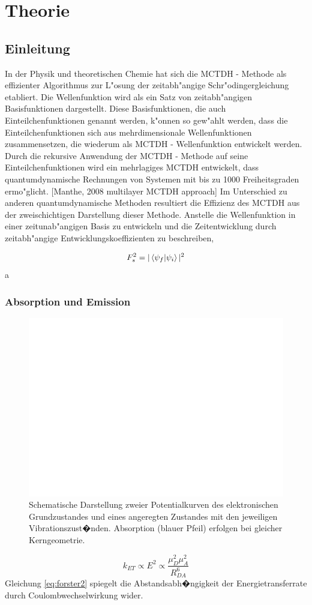 \chapter{Theorie}

\section{Einleitung}

In der Physik und theoretischen Chemie hat sich die MCTDH - Methode als effizienter Algorithmus zur L"osung der zeitabh"angige Schr"odingergleichung etabliert.
Die Wellenfunktion wird als ein Satz von zeitabh"angigen Basisfunktionen dargestellt.
Diese Basisfunktionen, die auch Einteilchenfunktionen genannt werden, k"onnen so gew"ahlt werden, dass die Einteilchenfunktionen sich aus mehrdimensionale Wellenfunktionen zusammensetzen, die wiederum als MCTDH - Wellenfunktion entwickelt werden.
Durch die rekursive Anwendung der MCTDH - Methode auf seine Einteilchenfunktionen wird ein mehrlagiges MCTDH entwickelt, dass quantumdynamische Rechnungen von Systemen mit bis zu 1000 Freiheitsgraden ermo"glicht. [Manthe, 2008 multilayer MCTDH approach]
Im Unterschied zu anderen quantumdynamische Methoden resultiert die Effizienz des MCTDH aus der zweischichtigen Darstellung dieser Methode.
Anstelle die Wellenfunktion in einer zeitunab"angigen Basis zu entwickeln und die Zeitentwicklung durch zeitabh"angige Entwicklungskoeffizienten zu beschreiben, 



 \begin{equation}
 F_{s}^{2}=|\Braket{\psi_{f}}{\psi_{i}}|^{2}
 \label{eq:franck1}
 \end{equation}
a
 \subsection{Absorption und Emission}
 \begin{figure}
\centering
\includegraphics[width=0.7\linewidth]{figures/Franck}
\caption{Schematische Darstellung zweier Potentialkurven des elektronischen Grundzustandes und eines angeregten Zustandes mit den jeweiligen Vibrationszust�nden. Absorption (blauer Pfeil) erfolgen bei gleicher Kerngeometrie.}
\label{fig:Franck}
\end{figure}
 \begin{equation}
k_{ET} \propto E^{2}\propto \frac{\mu_{D}^{2}\mu_{A}^{2}}{R_{DA}^{6}}
\label{eq:forster2}
 \end{equation}
  Gleichung \ref{eq:forster2} spiegelt die Abstandsabh�ngigkeit der Energietransferrate durch Coulombwechselwirkung wider.\cite{turro:1991}
